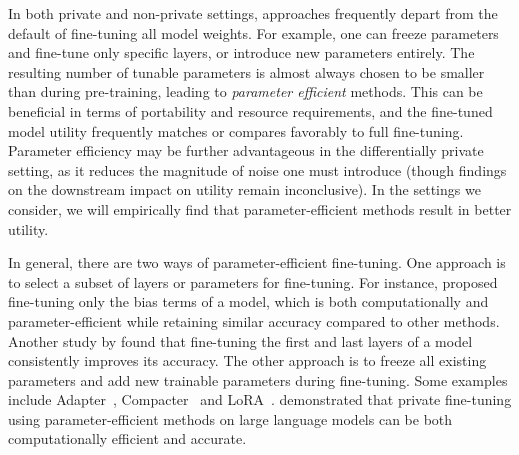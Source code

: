 \documentclass[11pt]{article}
\begin{document}
In both private and non-private settings, approaches frequently depart from the default of fine-tuning all model weights. 
For example, one can freeze parameters and fine-tune only specific layers, or introduce new parameters entirely.
The resulting number of tunable parameters is almost always chosen to be smaller  than during pre-training, leading to \emph{parameter efficient} methods.
This can be beneficial in terms of portability and resource requirements, and the fine-tuned model utility frequently matches or compares favorably to full fine-tuning. 
Parameter efficiency may be further advantageous in the differentially private setting, as it reduces the magnitude of noise one must introduce (though findings on the downstream impact on utility remain inconclusive).
In the settings we consider, we will empirically find that parameter-efficient methods result in better utility.


In general, there are two ways of parameter-efficient fine-tuning. One approach is to select a subset of layers or parameters for fine-tuning. For instance, \cite{bias-term} proposed fine-tuning only the bias terms of a model, which is both computationally and parameter-efficient while retaining similar accuracy compared to other methods. Another study by \cite{firstlast} found that fine-tuning the first and last layers of a model consistently improves its accuracy.  The other approach is to freeze all existing parameters and add new trainable parameters during fine-tuning. Some examples include Adapter~\cite{adapter}, Compacter~\cite{compacter} and LoRA~\cite{lora}. \cite{YuNBGIKKLMWYZ22,LiTLH22} demonstrated that private fine-tuning using parameter-efficient methods on large language models can be both computationally efficient and accurate.




\end{document}
